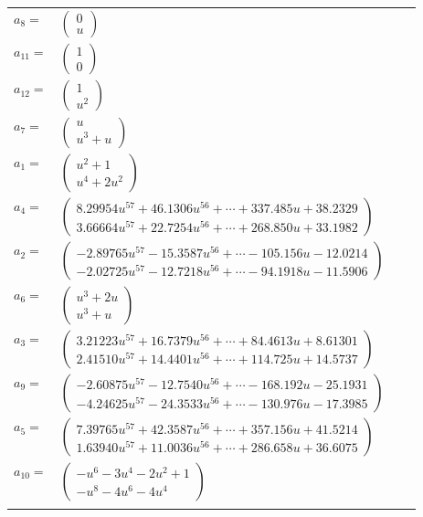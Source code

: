 \documentclass[1p]{elsarticle_modified}
\theoremstyle{definition}
\begin{document}
\begin{tabular}{m{7pt} m{180pt} m{7pt} m{180pt} }
\flushright $a_{8}=$&$\begin{pmatrix}0\\u\end{pmatrix}$ \\
\flushright $a_{11}=$&$\begin{pmatrix}1\\0\end{pmatrix}$ \\
\flushright $a_{12}=$&$\begin{pmatrix}1\\u^2\end{pmatrix}$ \\
\flushright $a_{7}=$&$\begin{pmatrix}u\\u^3+u\end{pmatrix}$ \\
\flushright $a_{1}=$&$\begin{pmatrix}u^2+1\\u^4+2 u^2\end{pmatrix}$ \\
\flushright $a_{4}=$&$\begin{pmatrix}8.29954 u^{57}+46.1306 u^{56}+\cdots+337.485 u+38.2329\\3.66664 u^{57}+22.7254 u^{56}+\cdots+268.850 u+33.1982\end{pmatrix}$ \\
\flushright $a_{2}=$&$\begin{pmatrix}-2.89765 u^{57}-15.3587 u^{56}+\cdots-105.156 u-12.0214\\-2.02725 u^{57}-12.7218 u^{56}+\cdots-94.1918 u-11.5906\end{pmatrix}$ \\
\flushright $a_{6}=$&$\begin{pmatrix}u^3+2 u\\u^3+u\end{pmatrix}$ \\
\flushright $a_{3}=$&$\begin{pmatrix}3.21223 u^{57}+16.7379 u^{56}+\cdots+84.4613 u+8.61301\\2.41510 u^{57}+14.4401 u^{56}+\cdots+114.725 u+14.5737\end{pmatrix}$ \\
\flushright $a_{9}=$&$\begin{pmatrix}-2.60875 u^{57}-12.7540 u^{56}+\cdots-168.192 u-25.1931\\-4.24625 u^{57}-24.3533 u^{56}+\cdots-130.976 u-17.3985\end{pmatrix}$ \\
\flushright $a_{5}=$&$\begin{pmatrix}7.39765 u^{57}+42.3587 u^{56}+\cdots+357.156 u+41.5214\\1.63940 u^{57}+11.0036 u^{56}+\cdots+286.658 u+36.6075\end{pmatrix}$ \\
\flushright $a_{10}=$&$\begin{pmatrix}- u^6-3 u^4-2 u^2+1\\- u^8-4 u^6-4 u^4\end{pmatrix}$\\&\end{tabular}
\end{document}
